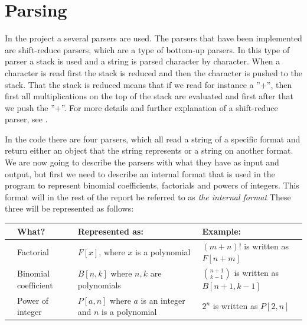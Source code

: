 \section{Parsing}
In the project a several parsers are used. The parsers that have been implemented are shift-reduce parsers, which are a type of bottom-up parsers. In this type of parser a stack is used and a string is parsed character by character. When a character is read first the stack is reduced and then the character is pushed to the stack. That the stack is reduced means that if we read for instance a ''$+$'', then first all multiplications on the top of the stack are evaluated and first after that we push the ''$+$''. For more details and further explanation of a shift-reduce parser, see .

In the code there are four parsers, which all read a string of a specific format and return either an object that the string represents or a string on another format. We are now going to describe the parsers with what they have as input and output, but first we need to describe an internal format that is used in the program to represent binomial coefficients, factorials and powers of integers. This format will in the rest of the report be referred to as \textit{the internal format} These three will be represented as follows:
\begin{center}
  \begin{tabular}{C{1mm}C{3cm}|C{4cm}|C{4cm}}
    &\textbf{What?}   & \textbf{Represented as:} & \textbf{Example:} \\ \hline
    &Factorial & $F[x]$, where $x$ is a polynomial & $(m+n)!$ is written as $F[n+m]$ \\ \hline
    &Binomial coefficient & $B[n,k]$ where $n,k$ are polynomials & $\binom{n+1}{k-1}$ is written as $B[n+1,k-1]$ \\ \hline
    &Power of integer & $P[a,n]$ where $a$ is an integer and $n$ is a polynomial & $2^n$ is written as $P[2,n]$ \\
  \end{tabular}
\end{center}

